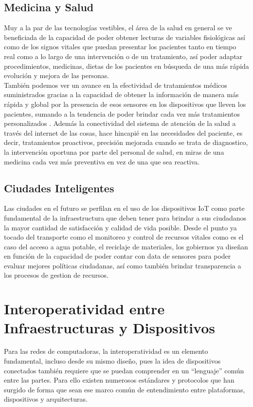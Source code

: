 \subsection{Medicina y Salud}
Muy a la par de las tecnologías vestibles, el área de la salud en general se ve beneficiada de la capacidad de poder obtener lecturas de variables fisiológicas así como de los signos vitales que puedan presentar los pacientes  tanto en tiempo real como a lo largo de una intervención o de un tratamiento, así poder adaptar procedimientos, medicinas, dietas de los pacientes en búsqueda de una más rápida evolución y mejora de las personas.\\

También podemos ver un avance en la efectividad de tratamientos médicos suministrados gracias a la capacidad de obtener la información de manera más rápida y global por la presencia de esos sensores en los dispositivos que lleven los pacientes, sumando a la tendencia de poder brindar cada vez más tratamientos personalizados \cite{ibmiotmedicina}. Además la conectividad del sistema de atención de la salud a través del internet de las cosas, hace hincapié en las necesidades del paciente, es decir, tratamientos proactivos, precisión mejorada cuando se trata de diagnostico, la intervención oportuna por parte del personal de salud, en miras de una medicina cada vez más preventiva en vez de una que sea reactiva. 

\subsection{Ciudades Inteligentes}
Las ciudades en el futuro se perfilan en el uso de los dispositivos IoT como parte fundamental de la infraestructura que deben tener para brindar a sus ciudadanos la mayor cantidad de satisfacción y calidad de vida posible. Desde el punto ya tocado del transporte como el monitoreo y control de recursos vitales como es el caso del acceso a agua potable, el reciclaje de materiales, los gobiernos ya diseñan en función de la capacidad de poder contar con data de sensores para poder evaluar mejores políticas ciudadanas, así como también brindar transparencia a los procesos de gestion de recursos\cite{ibmiotciudad}. 

\section{Interoperatividad entre Infraestructuras y Dispositivos}
Para las redes de computadoras, la interoperatividad es un elemento fundamental, incluso desde su mismo diseño, pues la idea de dispositivos conectados también requiere que se puedan comprender en un ``lenguaje'' común entre las partes. Para ello existen numerosos estándares y protocolos que han surgido de forma que sean ese marco común de entendimiento entre plataformas, dispositivos y arquitecturas.\\

